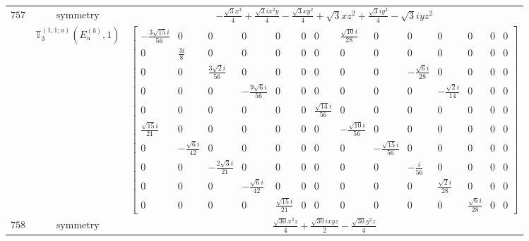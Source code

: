 \documentclass[fleqn,8pt,landscape]{jsarticle}
\begin{document}
\begin{longtable}{ccc}
$ 757 $ & $ \text{symmetry} $ & $ - \frac{\sqrt{3} x^{3}}{4} + \frac{\sqrt{3} i x^{2} y}{4} - \frac{\sqrt{3} x y^{2}}{4} + \sqrt{3} x z^{2} + \frac{\sqrt{3} i y^{3}}{4} - \sqrt{3} i y z^{2} $ \\
$  $ & $ \mathbb{T}_{3}^{(1,1;a)}(E_{u}^{(b)},1) $ & $ \begin{bmatrix} - \frac{3 \sqrt{15} i}{56} & 0 & 0 & 0 & 0 & 0 & 0 & \frac{\sqrt{10} i}{28} & 0 & 0 & 0 & 0 & 0 & 0 \\ 0 & \frac{3 i}{8} & 0 & 0 & 0 & 0 & 0 & 0 & 0 & 0 & 0 & 0 & 0 & 0 \\ 0 & 0 & \frac{3 \sqrt{2} i}{56} & 0 & 0 & 0 & 0 & 0 & 0 & - \frac{\sqrt{6} i}{28} & 0 & 0 & 0 & 0 \\ 0 & 0 & 0 & - \frac{9 \sqrt{6} i}{56} & 0 & 0 & 0 & 0 & 0 & 0 & - \frac{\sqrt{2} i}{14} & 0 & 0 & 0 \\ 0 & 0 & 0 & 0 & 0 & 0 & \frac{\sqrt{14} i}{56} & 0 & 0 & 0 & 0 & 0 & 0 & 0 \\ \frac{\sqrt{15} i}{21} & 0 & 0 & 0 & 0 & 0 & 0 & - \frac{\sqrt{10} i}{56} & 0 & 0 & 0 & 0 & 0 & 0 \\ 0 & - \frac{\sqrt{6} i}{42} & 0 & 0 & 0 & 0 & 0 & 0 & - \frac{\sqrt{15} i}{56} & 0 & 0 & 0 & 0 & 0 \\ 0 & 0 & - \frac{2 \sqrt{3} i}{21} & 0 & 0 & 0 & 0 & 0 & 0 & - \frac{i}{56} & 0 & 0 & 0 & 0 \\ 0 & 0 & 0 & - \frac{\sqrt{6} i}{42} & 0 & 0 & 0 & 0 & 0 & 0 & \frac{\sqrt{2} i}{28} & 0 & 0 & 0 \\ 0 & 0 & 0 & 0 & \frac{\sqrt{15} i}{21} & 0 & 0 & 0 & 0 & 0 & 0 & \frac{\sqrt{6} i}{28} & 0 & 0 \end{bmatrix} $ \\ \hline
$ 758 $ & $ \text{symmetry} $ & $ \frac{\sqrt{30} x^{2} z}{4} + \frac{\sqrt{30} i x y z}{2} - \frac{\sqrt{30} y^{2} z}{4} $ \\

\end{longtable}
\end{document}
